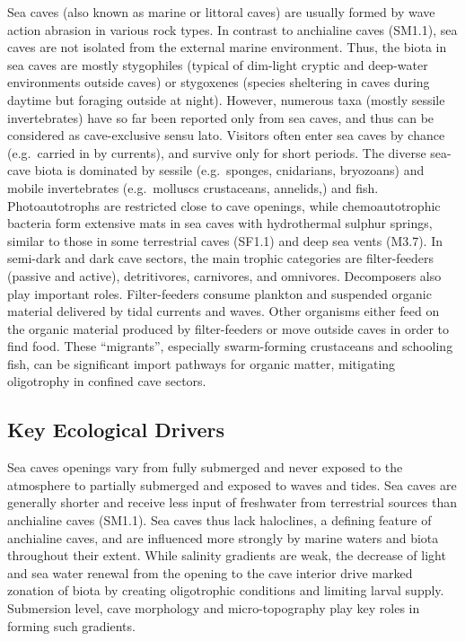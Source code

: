 \documentclass[
  letterpaper,
  DIV=11,
  numbers=noendperiod]{scrartcl}
\begin{document}
Sea caves (also known as marine or littoral caves) are usually formed by
wave action abrasion in various rock types. In contrast to anchialine
caves (SM1.1), sea caves are not isolated from the external marine
environment. Thus, the biota in sea caves are mostly stygophiles
(typical of dim-light cryptic and deep-water environments outside caves)
or stygoxenes (species sheltering in caves during daytime but foraging
outside at night). However, numerous taxa (mostly sessile invertebrates)
have so far been reported only from sea caves, and thus can be
considered as cave-exclusive sensu lato. Visitors often enter sea caves
by chance (e.g.~carried in by currents), and survive only for short
periods. The diverse sea-cave biota is dominated by sessile
(e.g.~sponges, cnidarians, bryozoans) and mobile invertebrates
(e.g.~molluscs crustaceans, annelids,) and fish. Photoautotrophs are
restricted close to cave openings, while chemoautotrophic bacteria form
extensive mats in sea caves with hydrothermal sulphur springs, similar
to those in some terrestrial caves (SF1.1) and deep sea vents (M3.7). In
semi-dark and dark cave sectors, the main trophic categories are
filter-feeders (passive and active), detritivores, carnivores, and
omnivores. Decomposers also play important roles. Filter-feeders consume
plankton and suspended organic material delivered by tidal currents and
waves. Other organisms either feed on the organic material produced by
filter-feeders or move outside caves in order to find food. These
``migrants'', especially swarm-forming crustaceans and schooling fish,
can be significant import pathways for organic matter, mitigating
oligotrophy in confined cave sectors.

\subsection{Key Ecological Drivers}\label{key-ecological-drivers-68}

Sea caves openings vary from fully submerged and never exposed to the
atmosphere to partially submerged and exposed to waves and tides. Sea
caves are generally shorter and receive less input of freshwater from
terrestrial sources than anchialine caves (SM1.1). Sea caves thus lack
haloclines, a defining feature of anchialine caves, and are influenced
more strongly by marine waters and biota throughout their extent. While
salinity gradients are weak, the decrease of light and sea water renewal
from the opening to the cave interior drive marked zonation of biota by
creating oligotrophic conditions and limiting larval supply. Submersion
level, cave morphology and micro-topography play key roles in forming
such gradients.
\end{document}
